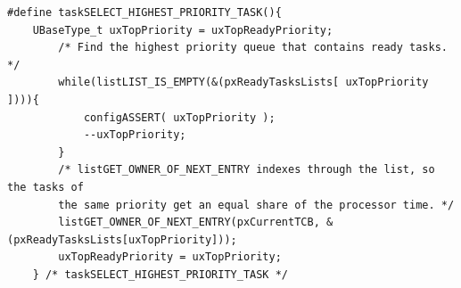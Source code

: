 \begin{lstlisting}[caption={FreeRTOS Source zur Priroty Task Selection aus Task.c. Alle lauffähigen Task werden in einem Array vewaltet pxReadyTaskLists. Die Listen verwalten sich durch Referenz-Pointer in den TCBs der einzelnen Tasks}, linewidth=8cm,captionpos=b, label=lst:nextTask, float=hbt]
#define taskSELECT_HIGHEST_PRIORITY_TASK(){																									
	UBaseType_t uxTopPriority = uxTopReadyPriority;														
		/* Find the highest priority queue that contains ready tasks. */								
		while(listLIST_IS_EMPTY(&(pxReadyTasksLists[ uxTopPriority ]))){																								
			configASSERT( uxTopPriority );																
			--uxTopPriority;																			
		}																								
		/* listGET_OWNER_OF_NEXT_ENTRY indexes through the list, so the tasks of						
		the	same priority get an equal share of the processor time. */									
		listGET_OWNER_OF_NEXT_ENTRY(pxCurrentTCB, &(pxReadyTasksLists[uxTopPriority]));			
		uxTopReadyPriority = uxTopPriority;																
	} /* taskSELECT_HIGHEST_PRIORITY_TASK */
\end{lstlisting}
